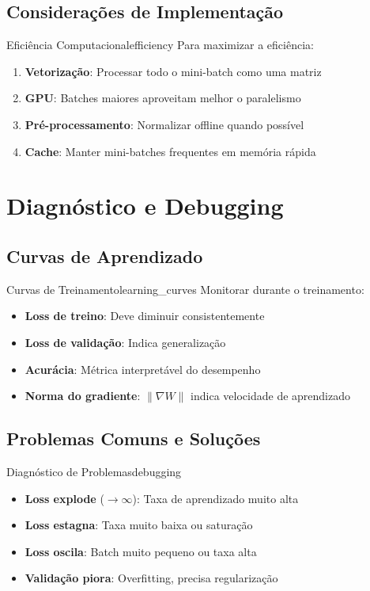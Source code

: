 \documentclass[a4paper,12pt]{article}
\begin{document}
\subsection{Considerações de Implementação}

\begin{observacao}{Eficiência Computacional}{efficiency}
Para maximizar a eficiência:
\begin{enumerate}
    \item \textbf{Vetorização}: Processar todo o mini-batch como uma matriz
    \item \textbf{GPU}: Batches maiores aproveitam melhor o paralelismo
    \item \textbf{Pré-processamento}: Normalizar offline quando possível
    \item \textbf{Cache}: Manter mini-batches frequentes em memória rápida
\end{enumerate}
\end{observacao}

\section{Diagnóstico e Debugging}

\subsection{Curvas de Aprendizado}

\begin{definicao}{Curvas de Treinamento}{learning_curves}
Monitorar durante o treinamento:
\begin{itemize}
    \item \textbf{Loss de treino}: Deve diminuir consistentemente
    \item \textbf{Loss de validação}: Indica generalização
    \item \textbf{Acurácia}: Métrica interpretável do desempenho
    \item \textbf{Norma do gradiente}: $\|\nabla W\|$ indica velocidade de aprendizado
\end{itemize}
\end{definicao}

\subsection{Problemas Comuns e Soluções}

\begin{observacao}{Diagnóstico de Problemas}{debugging}
\begin{itemize}
    \item \textbf{Loss explode} ($\to \infty$): Taxa de aprendizado muito alta
    \item \textbf{Loss estagna}: Taxa muito baixa ou saturação
    \item \textbf{Loss oscila}: Batch muito pequeno ou taxa alta
    \item \textbf{Validação piora}: Overfitting, precisa regularização
\end{itemize}
\end{observacao}
\end{document}
